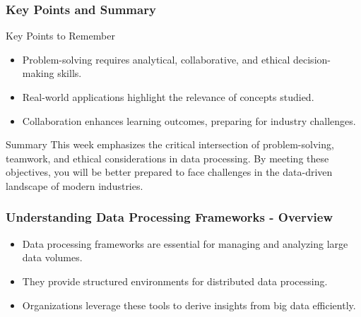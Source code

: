 \documentclass[aspectratio=169]{beamer}
\begin{document}
\begin{frame}[fragile]
    \frametitle{Key Points and Summary}
    \begin{block}{Key Points to Remember}
        \begin{itemize}
            \item Problem-solving requires analytical, collaborative, and ethical decision-making skills.
            \item Real-world applications highlight the relevance of concepts studied.
            \item Collaboration enhances learning outcomes, preparing for industry challenges.
        \end{itemize}
    \end{block}
    
    \begin{block}{Summary}
        This week emphasizes the critical intersection of problem-solving, teamwork, and ethical considerations in data processing. By meeting these objectives, you will be better prepared to face challenges in the data-driven landscape of modern industries.
    \end{block}
\end{frame}

\begin{frame}[fragile]
    \frametitle{Understanding Data Processing Frameworks - Overview}
    \begin{itemize}
        \item Data processing frameworks are essential for managing and analyzing large data volumes.
        \item They provide structured environments for distributed data processing.
        \item Organizations leverage these tools to derive insights from big data efficiently.
    \end{itemize}
\end{frame}
\end{document}
